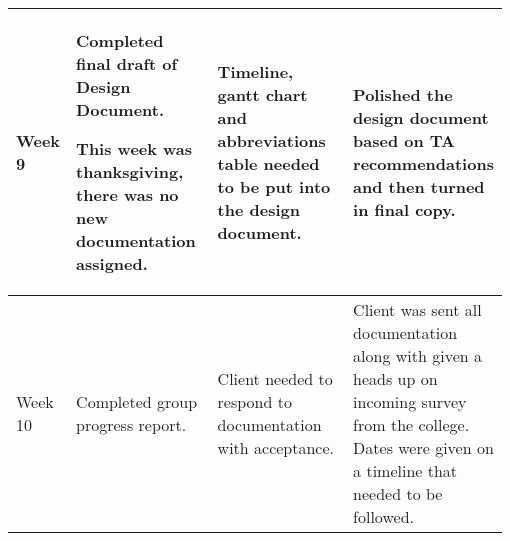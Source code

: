\documentclass[onecolumn, draftclsnofoot,10pt, compsoc]{IEEEtran}
\begin{document}
\begin{longtable}{ | p{0.075\linewidth} | p{0.3\linewidth} | p{0.3\linewidth} | p{0.3\linewidth} |}
    \\ \hline
    Week 9 
    &
    Completed final draft of Design Document.
    
  	This week was thanksgiving, there was no new documentation assigned.
  	&
  	Timeline, gantt chart and abbreviations table needed to be put into the design document.
  	&
    Polished the design document based on TA recommendations and then turned in final copy.
  	\\ \hline
    Week 10 
    &
  	Completed group progress report.
  	&
  	Client needed to respond to documentation with acceptance.
  	&
   	Client was sent all documentation along with given a heads up on incoming survey from the college. Dates were given on a timeline that needed to be followed.
   	\\ \hline
\end{longtable}
\end{document}
